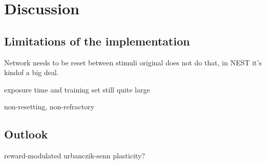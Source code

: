 
\chapter{Discussion}


\section{Limitations of the implementation}

Network needs to be reset between stimuli
    original does not do that, in NEST it's kindof a big deal.

exposure time and training set still quite large

non-resetting, non-refractory


\section{Outlook}

reward-modulated urbanczik-senn plasticity?

